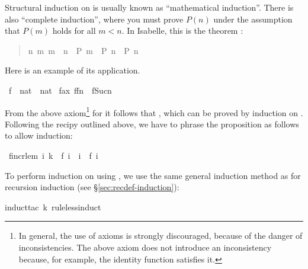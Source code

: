 \begin{isabellebody}
\begin{isamarkuptext}
Structural induction on  is
usually known as ``mathematical induction''. There is also ``complete
induction'', where you must prove $P(n)$ under the assumption that $P(m)$
holds for all $m<n$. In Isabelle, this is the theorem :
\begin{quote}

\begin{isabelle}%
{\isacharparenleft}{\isasymAnd}\mbox{n}{\isachardot}\ {\isasymforall}\mbox{m}{\isachardot}\ \mbox{m}\ {\isacharless}\ \mbox{n}\ {\isasymlongrightarrow}\ \mbox{P}\ \mbox{m}\ {\isasymLongrightarrow}\ \mbox{P}\ \mbox{n}{\isacharparenright}\ {\isasymLongrightarrow}\ \mbox{P}\ \mbox{n}
\end{isabelle}%

\end{quote}
Here is an example of its application.%
\end{isamarkuptext}%
\ f\ {\isacharcolon}{\isacharcolon}\ {\isachardoublequote}nat\ {\isacharequal}{\isachargreater}\ nat{\isachardoublequote}\isanewline
{}\ f{\isacharunderscore}ax{\isacharcolon}\ {\isachardoublequote}f{\isacharparenleft}f{\isacharparenleft}n{\isacharparenright}{\isacharparenright}\ {\isacharless}\ f{\isacharparenleft}Suc{\isacharparenleft}n{\isacharparenright}{\isacharparenright}{\isachardoublequote}%
\begin{isamarkuptext}%
\noindent
From the above axiom\footnote{In general, the use of axioms is strongly
discouraged, because of the danger of inconsistencies. The above axiom does
not introduce an inconsistency because, for example, the identity function
satisfies it.}
for  it follows that , which can
be proved by induction on . Following the recipy outlined
above, we have to phrase the proposition as follows to allow induction:%
\end{isamarkuptext}%
\ f{\isacharunderscore}incr{\isacharunderscore}lem{\isacharcolon}\ {\isachardoublequote}{\isasymforall}i{\isachardot}\ k\ {\isacharequal}\ f\ i\ {\isasymlongrightarrow}\ i\ {\isasymle}\ f\ i{\isachardoublequote}%
\begin{isamarkuptxt}%
\noindent
To perform induction on  using , we use the same
general induction method as for recursion induction (see
\S\ref{sec:recdef-induction}):%
\end{isamarkuptxt}%
induct{\isacharunderscore}tac\ k\ rule{\isacharcolon}less{\isacharunderscore}induct{\isacharparenright}%

\end{isabellebody}
